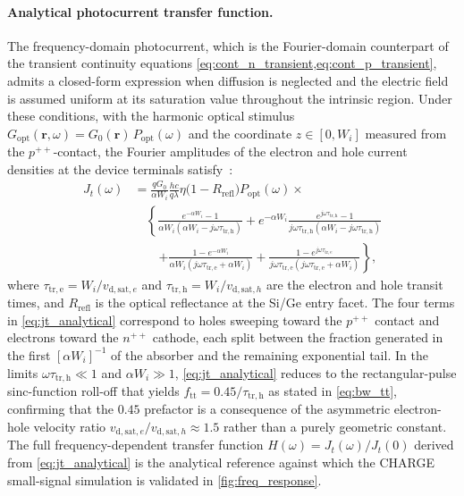 \paragraph{Analytical photocurrent transfer function.}
The frequency-domain photocurrent, which is the Fourier-domain counterpart of
the transient continuity equations \cref{eq:cont_n_transient,eq:cont_p_transient},
admits a closed-form expression when diffusion is neglected and the electric
field is assumed uniform at its saturation value throughout the intrinsic
region. Under these conditions, with the harmonic optical stimulus $G_{\mathrm{opt}}
(\mathbf{r},\omega) = G_0(\mathbf{r})\,P_{\mathrm{opt}}(\omega)$ and the
coordinate $z\in[0,W_i]$ measured from the $p^{++}$-contact, the Fourier
amplitudes of the electron and hole current densities at the device terminals
satisfy~\cite{Alasio2024}:
\begin{align}
    J_t(\omega)
    &= \frac{q G_0}{\alpha W_i}\frac{hc}{q\lambda}
       \eta\bigl(1 - R_{\mathrm{refl}}\bigr)P_{\mathrm{opt}}(\omega)
       \times \nonumber \\
    &\quad
      \left\{
        \frac{e^{-\alpha W_i}-1}{\alpha W_i(\alpha W_i - j\omega\tau_{\mathrm{tr,h}})}
        + e^{-\alpha W_i}
          \frac{e^{j\omega\tau_{\mathrm{tr,h}}}-1}
               {j\omega\tau_{\mathrm{tr,h}}(\alpha W_i - j\omega\tau_{\mathrm{tr,h}})}
      \right. \nonumber \\
    &\quad\quad
      \left.
        + \frac{1 - e^{-\alpha W_i}}{\alpha W_i(j\omega\tau_{\mathrm{tr,e}} + \alpha W_i)}
        + \frac{1 - e^{j\omega\tau_{\mathrm{tr,e}}}}{j\omega\tau_{\mathrm{tr,e}}
          (j\omega\tau_{\mathrm{tr,e}} + \alpha W_i)}
      \right\},
    \label{eq:jt_analytical}
\end{align}
where $\tau_{\mathrm{tr,e}} = W_i/v_{\mathrm{d,sat},e}$ and $\tau_{\mathrm{tr,h}}
= W_i/v_{\mathrm{d,sat},h}$ are the electron and hole transit times, and
$R_{\mathrm{refl}}$ is the optical reflectance at the Si/Ge entry facet. The
four terms in \cref{eq:jt_analytical} correspond to holes sweeping toward the
$p^{++}$ contact and electrons toward the $n^{++}$ cathode, each split between
the fraction generated in the first $[\alpha W_i]^{-1}$ of the absorber and the
remaining exponential tail. In the limits $\omega\tau_{\mathrm{tr,h}} \ll 1$
and $\alpha W_i \gg 1$, \cref{eq:jt_analytical} reduces to the rectangular-pulse
sinc-function roll-off that yields $f_{\mathrm{tt}} = 0.45/\tau_{\mathrm{tr,h}}$
as stated in \cref{eq:bw_tt}, confirming that the $0.45$ prefactor is a
consequence of the asymmetric electron-hole velocity ratio
$v_{\mathrm{d,sat},e}/v_{\mathrm{d,sat},h} \approx 1.5$ rather than a purely
geometric constant. The full frequency-dependent transfer function
$H(\omega) = J_t(\omega)/J_t(0)$ derived from \cref{eq:jt_analytical}
is the analytical reference against which the CHARGE small-signal simulation
is validated in \cref{fig:freq_response}.

